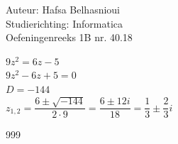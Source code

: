 \documentclass[a4paper]{article}
\begin{document}
\noindent \large Auteur: Hafsa Belhasnioui \\
\noindent \large Studierichting: Informatica\\
\noindent \large Oefeningenreeks 1B nr. 40.18\\

\medskip

\normalsize

$9z^2 = 6z-5$\\

$9z^2 -6z +5 = 0 $\\

$D = -144$\\

$z_{1,2} = \dfrac{6 \pm \sqrt{-144}}{2 \cdot 9} = \dfrac{6 \pm 12i}{18} = \dfrac{1}{3} \pm \dfrac{2}{3}i$\\


\begin{thebibliography}{999}
\end{thebibliography}
\end{document}
